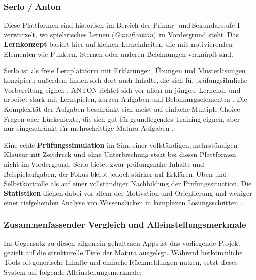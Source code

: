 \subsubsection{Serlo / Anton}
Diese Plattformen sind historisch im Bereich der Primar- und Sekundarstufe I verwurzelt, wo spielerisches Lernen (\textit{Gamification}) im Vordergrund steht. Das \textbf{Lernkonzept} basiert hier auf kleinen Lerneinheiten, die mit motivierenden Elementen wie Punkten, Sternen oder anderen Belohnungen verknüpft sind.

Serlo ist als freie Lernplattform mit Erklärungen, Übungen und Musterlösungen konzipiert; außerdem finden sich dort auch Inhalte, die sich für prüfungsähnliche Vorbereitung eignen \cite{SerloAbout}. ANTON richtet sich vor allem an jüngere Lernende und arbeitet stark mit Lernspielen, kurzen Aufgaben und Belohnungselementen \cite{AntonApp}. Die Komplexität der Aufgaben beschränkt sich meist auf einfache Multiple-Choice-Fragen oder Lückentexte, die sich gut für grundlegendes Training eignen, aber nur eingeschränkt für mehrschrittige Matura-Aufgaben \cite{AntonApp} \cite{SerloAbout}.

Eine echte \textbf{Prüfungssimulation} im Sinn einer vollständigen, mehrstündigen Klausur mit Zeitdruck und ohne Unterbrechung steht bei diesen Plattformen nicht im Vordergrund. Serlo bietet zwar prüfungsnahe Inhalte und Beispielaufgaben, der Fokus bleibt jedoch stärker auf Erklären, Üben und Selbstkontrolle als auf einer vollständigen Nachbildung der Prüfungssituation. Die \textbf{Statistiken} dienen dabei vor allem der Motivation und Orientierung und weniger einer tiefgehenden Analyse von Wissenslücken in komplexen Lösungsschritten \cite{SerloAbout} \cite{AntonApp}.

\subsubsection{Zusammenfassender Vergleich und Alleinstellungsmerkmale}
Im Gegensatz zu diesen allgemein gehaltenen Apps ist das vorliegende Projekt gezielt auf die strukturelle Tiefe der Matura ausgelegt. Während herkömmliche Tools oft generische Inhalte und einfache Rückmeldungen nutzen, setzt dieses System auf folgende Alleinstellungsmerkmale:

